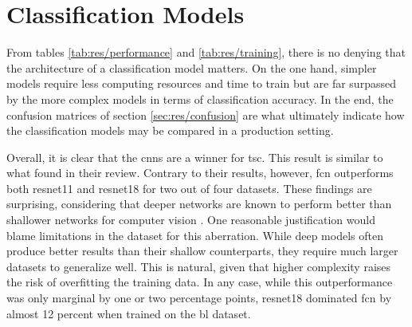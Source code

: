 \section{Classification Models}

From tables \ref{tab:res/performance} and \ref{tab:res/training}, there is no denying that the architecture of a classification model matters. On the one hand, simpler models require less computing resources and time to train but are far surpassed by the more complex models in terms of classification accuracy. In the end, the confusion matrices of section \ref{sec:res/confusion} are what ultimately indicate how the classification models may be compared in a production setting. 



Overall, it is clear that the \acrshort{cnn}s are a winner for \acrlong{tsc}. This result is similar to what \textcite{fawaz2018} found in their review. Contrary to their results, however, \acrshort{fcn} outperforms both \acrshort{resnet11} and \acrshort{resnet18} for two out of four datasets. These findings are surprising, considering that deeper networks are known to perform better than shallower networks for computer vision \cite{he2015}. One reasonable justification would blame limitations in the dataset for this aberration. While deep models often produce better results than their shallow counterparts, they require much larger datasets to generalize well. This is natural, given that higher complexity raises the risk of overfitting the training data.
In any case, while this outperformance was only marginal by one or two percentage points, \acrshort{resnet18} dominated \acrshort{fcn} by almost 12 percent when trained on the \acrshort{bl} dataset. 

